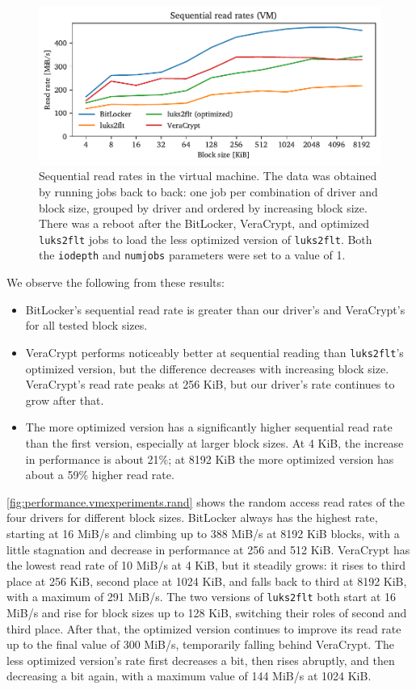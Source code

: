\begin{figure}[htb!]
	\center
	\includegraphics[scale=1]{../fig/performance.vmexperiments.seq.pdf}
	\caption[
		Sequential read rates in the virtual machine
	]{
		Sequential read rates in the virtual machine. The data was obtained by running jobs back to back: one job per combination of driver and block size, grouped by driver and ordered by increasing block size. There was a reboot after the BitLocker, VeraCrypt, and optimized \texttt{luks2flt} jobs to load the less optimized version of \texttt{luks2flt}. Both the \texttt{iodepth} and \texttt{numjobs} parameters were set to a value of 1.
	}
	\label{fig:performance.vmexperiments.seq}
\end{figure}

We observe the following from these results:
\begin{itemize}
	\item BitLocker's sequential read rate is greater than our driver's and VeraCrypt's for all tested block sizes.
	\item VeraCrypt performs noticeably better at sequential reading than \texttt{luks2flt}'s optimized version, but the difference decreases with increasing block size. VeraCrypt's read rate peaks at 256 KiB, but our driver's rate continues to grow after that.
	\item The more optimized version has a significantly higher sequential read rate than the first version, especially at larger block sizes. At 4 KiB, the increase in performance is about 21\%; at 8192 KiB the more optimized version has about a 59\% higher read rate.
\end{itemize}

\autoref{fig:performance.vmexperiments.rand} shows the random access read rates of the four drivers for different block sizes. BitLocker always has the highest rate, starting at 16 MiB/s and climbing up to 388 MiB/s at 8192 KiB blocks, with a little stagnation and decrease in performance at 256 and 512 KiB. VeraCrypt has the lowest read rate of 10 MiB/s at 4 KiB, but it steadily grows: it rises to third place at 256 KiB, second place at 1024 KiB, and falls back to third at 8192 KiB, with a maximum of 291 MiB/s. The two versions of \texttt{luks2flt} both start at 16 MiB/s and rise for block sizes up to 128 KiB, switching their roles of second and third place. After that, the optimized version continues to improve its read rate up to the final value of 300 MiB/s, temporarily falling behind VeraCrypt. The less optimized version's rate first decreases a bit, then rises abruptly, and then decreasing a bit again, with a maximum value of 144 MiB/s at 1024 KiB.

